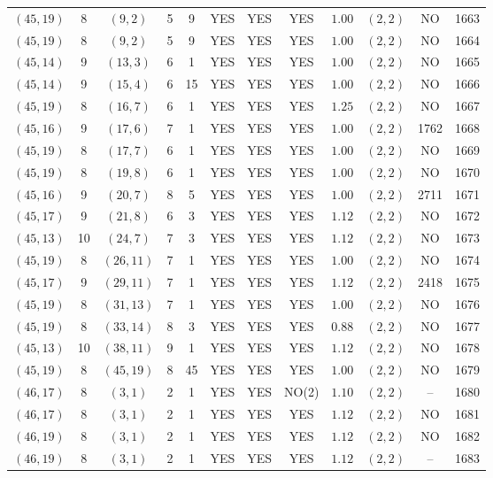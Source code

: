 \begin{longtable}{|c|c|c|c|c|c|c|c|c|c|c|c|}
$(45,19)$ & 8 & $(9,2)$ & 5 & 9 & YES & YES & YES & $1.00$ & $(2,2)$ & NO & 1663\\
$(45,19)$ & 8 & $(9,2)$ & 5 & 9 & YES & YES & YES & $1.00$ & $(2,2)$ & NO & 1664\\
$(45,14)$ & 9 & $(13,3)$ & 6 & 1 & YES & YES & YES & $1.00$ & $(2,2)$ & NO & 1665\\
$(45,14)$ & 9 & $(15,4)$ & 6 & 15 & YES & YES & YES & $1.00$ & $(2,2)$ & NO & 1666\\
$(45,19)$ & 8 & $(16,7)$ & 6 & 1 & YES & YES & YES & $1.25$ & $(2,2)$ & NO & 1667\\
$(45,16)$ & 9 & $(17,6)$ & 7 & 1 & YES & YES & YES & $1.00$ & $(2,2)$ & 1762 & 1668\\
$(45,19)$ & 8 & $(17,7)$ & 6 & 1 & YES & YES & YES & $1.00$ & $(2,2)$ & NO & 1669\\
$(45,19)$ & 8 & $(19,8)$ & 6 & 1 & YES & YES & YES & $1.00$ & $(2,2)$ & NO & 1670\\
$(45,16)$ & 9 & $(20,7)$ & 8 & 5 & YES & YES & YES & $1.00$ & $(2,2)$ & 2711 & 1671\\
$(45,17)$ & 9 & $(21,8)$ & 6 & 3 & YES & YES & YES & $1.12$ & $(2,2)$ & NO & 1672\\
$(45,13)$ & 10 & $(24,7)$ & 7 & 3 & YES & YES & YES & $1.12$ & $(2,2)$ & NO & 1673\\
$(45,19)$ & 8 & $(26,11)$ & 7 & 1 & YES & YES & YES & $1.00$ & $(2,2)$ & NO & 1674\\
$(45,17)$ & 9 & $(29,11)$ & 7 & 1 & YES & YES & YES & $1.12$ & $(2,2)$ & 2418 & 1675\\
$(45,19)$ & 8 & $(31,13)$ & 7 & 1 & YES & YES & YES & $1.00$ & $(2,2)$ & NO & 1676\\
$(45,19)$ & 8 & $(33,14)$ & 8 & 3 & YES & YES & YES & $0.88$ & $(2,2)$ & NO & 1677\\
$(45,13)$ & 10 & $(38,11)$ & 9 & 1 & YES & YES & YES & $1.12$ & $(2,2)$ & NO & 1678\\
$(45,19)$ & 8 & $(45,19)$ & 8 & 45 & YES & YES & YES & $1.00$ & $(2,2)$ & NO & 1679\\
$(46,17)$ & 8 & $(3,1)$ & 2 & 1 & YES & YES & NO(2) & $1.10$ & $(2,2)$ & -- & 1680\\
$(46,17)$ & 8 & $(3,1)$ & 2 & 1 & YES & YES & YES & $1.12$ & $(2,2)$ & NO & 1681\\
$(46,19)$ & 8 & $(3,1)$ & 2 & 1 & YES & YES & YES & $1.12$ & $(2,2)$ & NO & 1682\\
$(46,19)$ & 8 & $(3,1)$ & 2 & 1 & YES & YES & YES & $1.12$ & $(2,2)$ & -- & 1683\\

\end{longtable}
